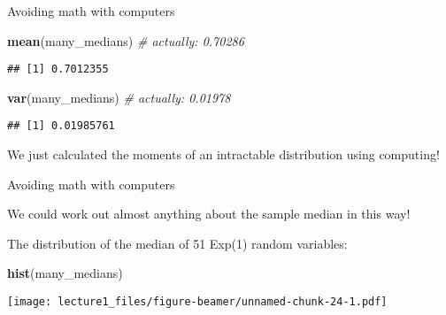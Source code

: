 \documentclass[ignorenonframetext,]{beamer}
\newenvironment{Shaded}{\begin{snugshade}}{\end{snugshade}}
\newcommand{\CommentTok}[1]{\textcolor[rgb]{0.56,0.35,0.01}{\textit{#1}}}
\newcommand{\KeywordTok}[1]{\textcolor[rgb]{0.13,0.29,0.53}{\textbf{#1}}}
\newcommand{\NormalTok}[1]{#1}
\begin{document}
\begin{frame}[fragile]{Avoiding math with computers}
\protect\hypertarget{avoiding-math-with-computers-2}{}

\begin{Shaded}
\begin{Highlighting}[]
\KeywordTok{mean}\NormalTok{(many_medians) }\CommentTok{# actually: 0.70286}
\end{Highlighting}
\end{Shaded}

\begin{verbatim}
## [1] 0.7012355
\end{verbatim}

\begin{Shaded}
\begin{Highlighting}[]
\KeywordTok{var}\NormalTok{(many_medians) }\CommentTok{# actually: 0.01978}
\end{Highlighting}
\end{Shaded}

\begin{verbatim}
## [1] 0.01985761
\end{verbatim}

We just calculated the moments of an intractable distribution using
computing!

\end{frame}

\begin{frame}[fragile]{Avoiding math with computers}
\protect\hypertarget{avoiding-math-with-computers-3}{}

We could work out almost anything about the sample median in this way!

The distribution of the median of 51 Exp(1) random variables:

\begin{Shaded}
\begin{Highlighting}[]
\KeywordTok{hist}\NormalTok{(many_medians)}
\end{Highlighting}
\end{Shaded}

\texttt{[image: lecture1\_files/figure-beamer/unnamed-chunk-24-1.pdf]}

\end{frame}
\end{document}
